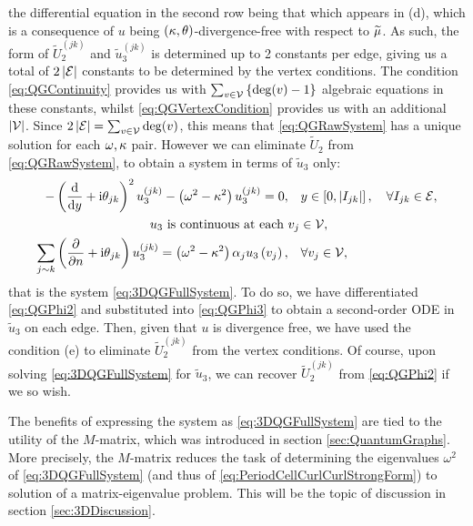 the differential equation in the second row being that which appears in (d), which is a consequence of $u$ being $\left( \kappa, \theta \right)$-divergence-free with respect to $\widetilde{\mu}$.
As such, the form of $\widetilde{U}_2^{(jk)}$ and $\widetilde{u}_3^{(jk)}$ is determined up to 2 constants per edge, giving us a total of $2\left\lvert \mathcal{E} \right\rvert$ constants to be determined by the vertex conditions.
The condition \eqref{eq:QGContinuity} provides us with $\sum_{v\in\mathcal{V}}\left\{ \mathrm{deg}(v)-1 \right\}$ algebraic equations in these constants, whilst \eqref{eq:QGVertexCondition} provides us with an additional $\left\lvert \mathcal{V} \right\rvert$.
Since $2\left\lvert \mathcal{E} \right\rvert = \sum_{v\in\mathcal{V}}\mathrm{deg}(v)$, this means that \eqref{eq:QGRawSystem} has a unique solution for each $\omega, \kappa$ pair.
However we can eliminate $\widetilde{U}_2$ from \eqref{eq:QGRawSystem}, to obtain a system in terms of $\widetilde{u}_3$ only:
\begin{align*}
	- \left(  \dfrac{\mathrm{d}}{\mathrm{d}y} + \mathrm{i}\theta_{jk}  \right)^2 u_3^{(jk)} - \left( \omega^2-\kappa^2 \right)u_3^{(jk)} = 0, &\quad y\in\left[ 0,\left\lvert I_{jk} \right\rvert \right], \quad\forall I_{jk}\in\mathcal{E}, \\
	u_3 \text{ is continuous at each } & v_j\in\mathcal{V}, \\
	\sum_{j\sim k}\left(  \dfrac{\partial }{\partial n} + \mathrm{i}\theta_{jk}  \right)u_3^{(jk)} = \left( \omega^2-\kappa^2 \right)\alpha_j u_3\left( v_j \right), &\quad\forall v_j\in\mathcal{V},
\end{align*}
that is the system \eqref{eq:3DQGFullSystem}.
To do so, we have differentiated \eqref{eq:QGPhi2} and substituted into \eqref{eq:QGPhi3} to obtain a second-order ODE in $\widetilde{u}_3$ on each edge.
Then, given that $u$ is divergence free, we have used the condition (e) to eliminate $\widetilde{U}_2^{(jk)}$ from the vertex conditions.
Of course, upon solving \eqref{eq:3DQGFullSystem} for $\widetilde{u}_3$, we can recover $\widetilde{U}_2^{(jk)}$ from \eqref{eq:QGPhi2} if we so wish.

The benefits of expressing the system as \eqref{eq:3DQGFullSystem} are tied to the utility of the $M$-matrix, which was introduced in section \ref{sec:QuantumGraphs}.
More precisely, the $M$-matrix reduces the task of determining the eigenvalues $\omega^2$ of \eqref{eq:3DQGFullSystem} (and thus of \eqref{eq:PeriodCellCurlCurlStrongForm}) to solution of a matrix-eigenvalue problem.
This will be the topic of discussion in section \ref{sec:3DDiscussion}.
